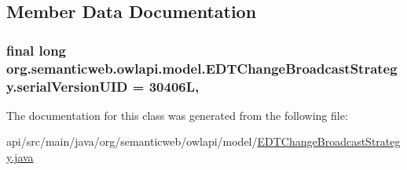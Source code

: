 \subsection{Member Data Documentation}
\hypertarget{classorg_1_1semanticweb_1_1owlapi_1_1model_1_1_e_d_t_change_broadcast_strategy_af7905381451774d4c07f424d7a5022d2}{
\subsubsection[{serial\-Version\-U\-I\-D}]{\setlength{\rightskip}{0pt plus 5cm}final long org.\-semanticweb.\-owlapi.\-model.\-E\-D\-T\-Change\-Broadcast\-Strategy.\-serial\-Version\-U\-I\-D = 30406\-L\hspace{0.3cm}{\ttfamily [static]}, {\ttfamily [private]}}}\label{classorg_1_1semanticweb_1_1owlapi_1_1model_1_1_e_d_t_change_broadcast_strategy_af7905381451774d4c07f424d7a5022d2}


The documentation for this class was generated from the following file\-:\begin{DoxyCompactItemize}
\item 
api/src/main/java/org/semanticweb/owlapi/model/\hyperlink{_e_d_t_change_broadcast_strategy_8java}{E\-D\-T\-Change\-Broadcast\-Strategy.\-java}\end{DoxyCompactItemize}
